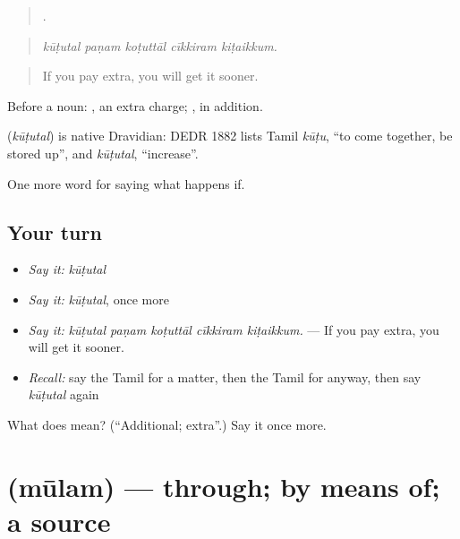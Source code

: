 \begin{quote}
    .
\end{quote}

\begin{quote}
\emph{kūṭutal paṇam koṭuttāl cīkkiram kiṭaikkum.}
\end{quote}

\begin{quote}
If you pay extra, you will get it sooner.
\end{quote}

Before a noun:  , an extra charge; , in addition.

\begin{cousinweb}
\textbf{} (\emph{kūṭutal}) is native Dravidian: DEDR 1882 lists Tamil \emph{kūṭu}, \textquotedblleft{}to come together, be stored up\textquotedblright{}, and \emph{kūṭutal}, \textquotedblleft{}increase\textquotedblright{}.
\end{cousinweb}

\begin{grammarlens}[title={What you've built}]
One more word for saying what happens if.
\end{grammarlens}

\subsection*{Your turn}
\begin{itemize}
\raggedright
  \item \emph{Say it:} \emph{kūṭutal}
  \item \emph{Say it:} \emph{kūṭutal}, once more
  \item \emph{Say it:} \emph{kūṭutal paṇam koṭuttāl cīkkiram kiṭaikkum.} — If you pay extra, you will get it sooner.
  \item \emph{Recall:} say the Tamil for a matter, then the Tamil for anyway, then say \emph{kūṭutal} again
\end{itemize}

\begin{tcolorbox}[breakable,colback=teal!4,colframe=teal!35!black,title={Before you move on}]
What does  mean? (\textquotedblleft{}Additional; extra\textquotedblright{}.) Say it once more.
\end{tcolorbox}
\section[\texorpdfstring{\ta{மூலம்} (mūlam)}{மூலம் (mūlam)}]{ (mūlam) — through; by means of; a source}

